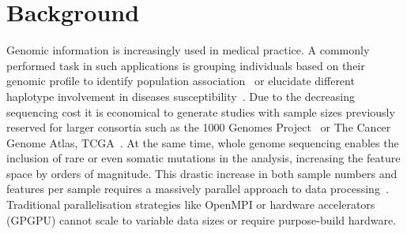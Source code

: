 \documentclass{bmcart}
\begin{document}


\section*{Background}

Genomic information is increasingly used in medical practice.
A commonly performed task in such applications is grouping individuals based on their genomic profile to identify population association~\cite{Gao2007} or elucidate different haplotype involvement in diseases susceptibility~\cite{Laitman2013}.  
Due to the decreasing sequencing cost it is economical to generate studies with sample sizes previously reserved for larger consortia such as the 1000 Genomes Project~\cite{1KG2012} or The Cancer Genome Atlas, TCGA~\cite{TCGA2013}. 
At the same time, whole genome sequencing enables the inclusion of rare or even somatic mutations in the analysis, increasing the feature space by orders of magnitude. This drastic increase in both sample numbers and features per sample requires a massively parallel approach to data processing~\cite{Stein2010}. Traditional parallelisation strategies like OpenMPI or hardware accelerators (GPGPU) cannot scale to variable data sizes or require purpose-build hardware.
 
\end{document}
